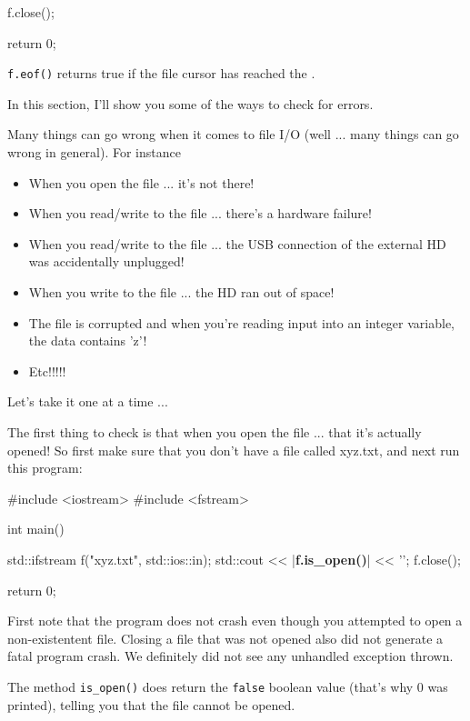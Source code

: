 \begin{consolethree}[escapeinside=||]
\begin{consolethree}[escapeinside=||]
{    f.close();

    return 0;
}
\end{consolethree}

\texttt{f.eof()} returns true if the file cursor has reached the .

\newpage{}

In this section, I'll show you some of the ways to check
for errors.

Many things can go wrong when it comes to file I/O (well ... many things
can go wrong in general). For instance

\begin{itemize}
\item
  When you open the file ... it's not there!
\item
  When you read/write to the file ... there's a hardware failure!
\item
  When you read/write to the file ... the USB connection of the external HD was accidentally unplugged!
\item
  When you write to the file ... the HD ran out of space!
\item
  The file is corrupted and when you're reading input into an integer variable, the data contains 'z'!
\item
  Etc!!!!!
\end{itemize}

Let's take it one at a time ...

\newpage{}

The first thing to check is that when you open the file ... that it's actually opened! So first make sure that you don't have a file called xyz.txt, and next run this program:

\begin{consolethree}[escapeinside=||]
#include <iostream>
#include <fstream>

int main()
{   
    std::ifstream f("xyz.txt", std::ios::in);
    std::cout << |\textbf{f.is\_open()}| << '\n';
    f.close();
    
    return 0;
}
\end{consolethree}

First note that the program does not crash even though you attempted to
open a non-existentent file. Closing a file that was not opened also did
not generate a fatal program crash. We definitely did not see any
unhandled exception thrown.

The method \verb!is_open()! does return the \texttt{false} boolean value (that's why 0 was printed), telling you that the file cannot be opened.


\end{consolethree}
